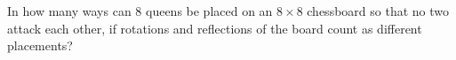 In how many ways can $8$ queens be placed on an $8\times8$ chessboard so that no two attack each other, if rotations and reflections of the board count as different placements?
